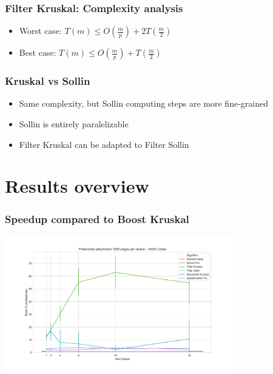 \documentclass{beamer}
\begin{document}
\begin{frame}

    \frametitle{Filter Kruskal: Complexity analysis}

    \begin{itemize}
        \item Worst case:
            $T(m) \leq O\left( \frac{m}{p} \right) + 2 T\left( \frac{m}{2} \right) $
            \\
        \item Best case:
            $T(m) \leq O\left( \frac{m}{p} \right) + T\left( \frac{m}{2} \right) $
            \\
    \end{itemize}

\end{frame}

\begin{frame}
    \frametitle{Kruskal vs Sollin}
    \begin{itemize}
        \item Same complexity, but Sollin computing steps are more fine-grained
        \item Sollin is entirely paralelizable
        \item Filter Kruskal can be adapted to Filter Sollin
    \end{itemize}
\end{frame}


\section{Results overview}

\begin{frame}
\frametitle{Speedup compared to Boost Kruskal}
\centering
\includegraphics[width=10cm]{BoostKruskalSpeedup1.png}
\end{frame}
\end{document}
